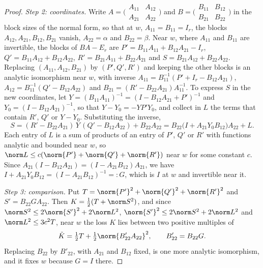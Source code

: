 \begin{refsection}
\begin{proof}
\emph{Step 2: coordinates.} Write $A=\bigl(\begin{smallmatrix}A_{11}&A_{12}\\A_{21}&A_{22}\end{smallmatrix}\bigr)$ and $B=\bigl(\begin{smallmatrix}B_{11}&B_{12}\\B_{21}&B_{22}\end{smallmatrix}\bigr)$ in the block sizes of the normal form, so that at $w$, $A_{11}=B_{11}=I_r$, the blocks $A_{12},A_{21},B_{12},B_{21}$ vanish, $A_{22}=\alpha$ and $B_{22}=\beta$. Near $w$, where $A_{11}$ and $B_{11}$ are invertible, the blocks of $BA-E_r$ are $P'=B_{11}A_{11}+B_{12}A_{21}-I_r$, $Q'=B_{11}A_{12}+B_{12}A_{22}$, $R'=B_{21}A_{11}+B_{22}A_{21}$ and $S=B_{21}A_{12}+B_{22}A_{22}$. Replacing $(A_{11},A_{12},B_{21})$ by $(P',Q',R')$ and keeping the other blocks is an analytic isomorphism near $w$, with inverse $A_{11}=B_{11}^{-1}(P'+I_r-B_{12}A_{21})$, $A_{12}=B_{11}^{-1}(Q'-B_{12}A_{22})$ and $B_{21}=(R'-B_{22}A_{21})A_{11}^{-1}$. To express $S$ in the new coordinates, let $Y=(B_{11}A_{11})^{-1}=(I-B_{12}A_{21}+P')^{-1}$ and $Y_0=(I-B_{12}A_{21})^{-1}$, so that $Y-Y_0=-YP'Y_0$, and collect in $L$ the terms that contain $R'$, $Q'$ or $Y-Y_0$. Substituting the inverse,
\[
S=(R'-B_{22}A_{21})\,Y\,(Q'-B_{12}A_{22})+B_{22}A_{22}=B_{22}\bigl(I+A_{21}Y_0B_{12}\bigr)A_{22}+L .
\]
Each entry of $L$ is a sum of products of an entry of $P'$, $Q'$ or $R'$ with functions analytic and bounded near $w$, so $\norm L\le c(\norm{P'}+\norm{Q'}+\norm{R'})$ near $w$ for some constant $c$. Since $A_{21}(I-B_{12}A_{21})=(I-A_{21}B_{12})A_{21}$, we have $I+A_{21}Y_0B_{12}=(I-A_{21}B_{12})^{-1}=:G$, which is $I$ at $w$ and invertible near it.

\emph{Step 3: comparison.} Put $T=\norm{P'}^2+\norm{Q'}^2+\norm{R'}^2$ and $S'=B_{22}GA_{22}$. Then $K=\frac12(T+\norm S^2)$, and since $\norm S^2\le2\norm{S'}^2+2\norm L^2$, $\norm{S'}^2\le2\norm S^2+2\norm L^2$ and $\norm L^2\le3c^2T$, near $w$ the loss $K$ lies between two positive multiples of
\[
\tilde K=\tfrac12T+\tfrac12\norm{B'_{22}A_{22}}^2,\qquad B'_{22}=B_{22}G .
\]
Replacing $B_{22}$ by $B'_{22}$, with $A_{21}$ and $B_{12}$ fixed, is one more analytic isomorphism, and it fixes $w$ because $G=I$ there.


\end{proof}
\end{refsection}
